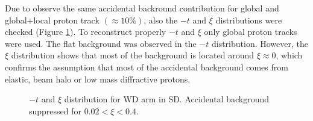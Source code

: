 Due to observe the same  accidental backround contribution  for global and global+local proton track $\left(\approx 10\%\right)$, also the $-t$ and $\xi$ distributions were checked (Figure \ref{fig:txiSD}). To reconstruct properly $-t$ and $\xi$ only global proton tracks were used. The flat background was observed in the $-t$ distribution. However, the $\xi$ distribution shows that most of the background is located around $\xi\approx 0$, which confirms the assumption that most of the accidental background comes from elastic, beam halo or low mass diffractive protons.
\begin{figure}[h]
	\centering
	\parbox{0.48\textwidth}{
		\centering
		\begin{subfigure}[b]{\linewidth}{
				}
		\end{subfigure}
	}
	\quad
	\parbox{0.48\textwidth}{
		\centering
		\begin{subfigure}[b]{\linewidth}{
				}
		\end{subfigure}
	}
	\caption[$-t$ and $\xi$ distribution for WD arm in SD]{$-t$ and $\xi$ distribution for WD arm in SD. Accidental background suppressed for $0.02<\xi<0.4$.}
	 \label{fig:txiSD}
\end{figure}

